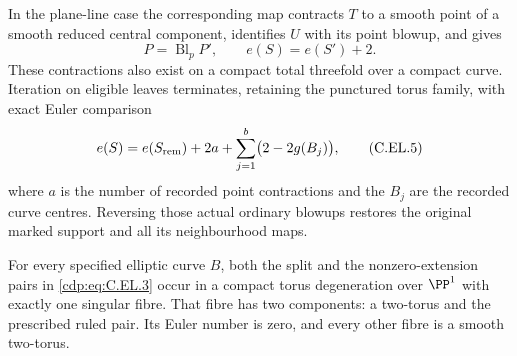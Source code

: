 \begin{proposition}
In the plane-line case the corresponding map contracts $T$ to a
smooth point of a smooth reduced central component, identifies
$U$ with its point blowup, and gives
\[
       P=\operatorname{Bl}_{p}P',\qquad e(S)=e(S')+2.
                                                        \tag{C.EL.4}\label{cdp:eq:C.EL.4}
\]
These contractions also exist on a compact total threefold over a
compact curve. Iteration on eligible leaves terminates, retaining
the punctured torus family, with exact Euler comparison
\[
 e(S)=e(S_{\rm rem})+2a+\sum_{j=1}^{b}\bigl(2-2g(B_j)\bigr),
                                                        \tag{C.EL.5}\label{cdp:eq:C.EL.5}
\]
where $a$ is the number of recorded point contractions and the
$B_j$ are the recorded curve centres. Reversing those actual
ordinary blowups restores the original marked support and all
its neighbourhood maps.

For every specified elliptic curve $B$, both the split and the
nonzero-extension pairs in \eqref{cdp:eq:C.EL.3} occur in a compact torus
degeneration over $\PP^1$ with exactly one singular fibre. That
fibre has two components: a two-torus and the prescribed ruled
pair. Its Euler number is zero, and every other fibre is a smooth
two-torus.
\end{proposition}

